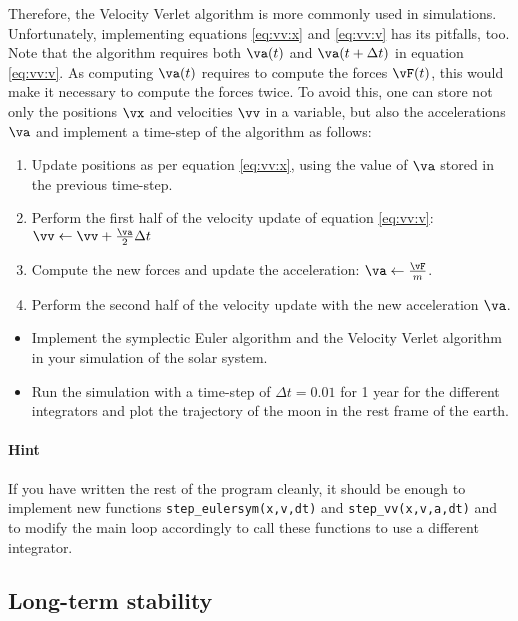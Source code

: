 Therefore, the Velocity Verlet algorithm is more commonly used in
simulations.  Unfortunately, implementing equations \eqref{eq:vv:x} and
\eqref{eq:vv:v} has its pitfalls, too.  Note that the algorithm requires
both $\va(t)$ and $\va(t+\Delta t)$ in equation \eqref{eq:vv:v}.  As
computing $\va(t)$ requires to compute the forces $\vF(t)$, this would
make it necessary to compute the forces twice.  To avoid this, one can
store not only the positions $\vx$ and velocities $\vv$ in a variable,
but also the accelerations $\va$ and implement a time-step of the
algorithm as follows:
\begin{enumerate}
\item Update positions as per equation \eqref{eq:vv:x}, using the value
  of $\va$ stored in the previous time-step.
\item Perform the first half of the velocity update of equation
  \eqref{eq:vv:v}: $\vv \leftarrow \vv + \frac{\va}{2} \Delta t$
\item Compute the new forces and update the acceleration: $\va
  \leftarrow \frac{\vF}{m}$.
\item Perform the second half of the velocity update with the new
  acceleration $\va$.
\end{enumerate}

\begin{task}[3]
  \begin{itemize}
  \item Implement the symplectic Euler algorithm and the Velocity
    Verlet algorithm in your simulation of the solar system.
  \item Run the simulation with a time-step of $\Delta t=0.01$ for 1
    year for the different integrators and plot the trajectory of the
    moon in the rest frame of the earth.
  \end{itemize}
\end{task}

\paragraph{Hint}
If you have written the rest of the program cleanly, it should be
enough to implement new functions \lstinline!step_eulersym(x,v,dt)!
and \lstinline!step_vv(x,v,a,dt)! and to modify the main loop
accordingly to call these functions to use a different integrator.

\subsection{Long-term stability}

